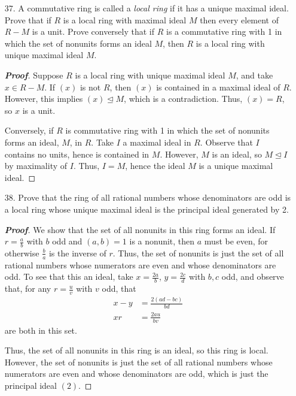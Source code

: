 \documentclass[12pt,leqno]{book}
\theoremstyle{definition}
\newenvironment{Proof}{\begin{proof}[\textnormal{\textbf{Proof}}]}{\end{proof}}
\begin{document}
\begin{enumerate}
\begin{Proof}
Observe that $R[[x]]/(x)\cong R$, for the map $\phi:R[[x]]\to R$ given by \[\phi\left(\sum_{n=0}^{\infty}a_nx^n\right)=a_0\] describes a ring homomorphism with kernel $(x)$. However, the ideal $(x)$ is maximal if and only if $R[[x]]/(x)\cong R$ is a field.
\end{Proof}

\item [37.] A commutative ring is called a \textit{local ring} if it has a unique maximal ideal. Prove that if $R$ is a local ring with maximal ideal $M$ then every element of $R-M$ is a unit. Prove conversely that if $R$ is a commutative ring with 1 in which the set of nonunits forms an ideal $M$, then $R$ is a local ring with unique maximal ideal $M$.

\begin{Proof}
 Suppose $R$ is a local ring with unique maximal ideal $M$, and take $x\in R-M$. If $(x)$ is not $R$, then $(x)$ is contained in a maximal ideal of $R$. However, this implies $(x)\unlhd M$, which is a contradiction. Thus, $(x)=R$, so $x$ is a unit.

Conversely, if $R$ is commutative ring with 1 in which the set of nonunits forms an ideal, $M$, in $R$. Take $I$ a maximal ideal in $R$. Observe that $I$ contains no units, hence is contained in $M$. However, $M$ is an ideal, so $M\unlhd I$ by maximality of $I$. Thus, $I=M$, hence the ideal $M$ is a unique maximal ideal.
\end{Proof}

\item [38.] Prove that the ring of all rational numbers whose denominators are odd is a local ring whose unique maximal ideal is the principal ideal generated by 2.

\begin{Proof}
 We show that the set of all nonunits in this ring forms an ideal. If $r=\frac{a}{b}$ with $b$ odd and $(a,b)=1$ is a nonunit, then $a$ must be even, for otherwise $\frac{b}{a}$ is the inverse of $r$. Thus, the set of nonunits is just the set of all rational numbers whose numerators are even and whose denominators are odd. To see that this an ideal, take $x=\frac{2a}{b}$, $y=\frac{2c}{d}$ with $b,c$ odd, and observe that, for any $r=\frac{u}{v}$ with $v$ odd, that \begin{align*}x-y&=\frac{2(ad-bc)}{bd}\\xr&=\frac{2au}{bv}\end{align*} are both in this set. 

 Thus, the set of all nonunits in this ring is an ideal, so this ring is local. However, the set of nonunits is just the set of all rational numbers whose numerators are even and whose denominators are odd, which is just the principal ideal $(2)$.
\end{Proof}

\end{enumerate}
\end{document}
